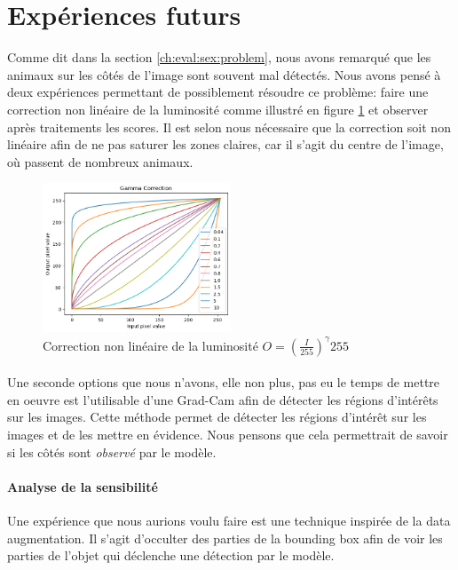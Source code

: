 \section{Expériences futurs}
Comme dit dans la section \ref{ch:eval:sex:problem}, nous avons remarqué que les animaux sur les côtés de l'image sont souvent mal détectés. Nous avons pensé à deux expériences permettant de possiblement résoudre ce problème: faire une correction non linéaire de la luminosité comme illustré en figure \ref{fig:gamma_correction} et observer après traitements les scores. Il est selon nous nécessaire que la correction soit non linéaire afin de ne pas saturer les zones claires, car il s'agit du centre de l'image, où passent de nombreux animaux.
\begin{figure}[H]
\centering
\includegraphics[width=0.5\textwidth]{images/gamma_correction.png}
\caption{Correction non linéaire de la luminosité $O = \displaystyle{\left( \frac{I}{255} \right)^\gamma255}$}
\label{fig:gamma_correction}
\end{figure}

\paragraph{}
Une seconde options que nous n'avons, elle non plus, pas eu le temps de mettre en oeuvre est l'utilisable d'une Grad-Cam afin de détecter les régions d'intérêts sur les images. Cette méthode permet de détecter les régions d'intérêt sur les images et de les mettre en évidence. Nous pensons que cela permettrait de savoir si les côtés sont \textit{observé} par le modèle.

\paragraph{Analyse de la sensibilité}
Une expérience que nous aurions voulu faire est une technique inspirée de la data augmentation. Il s'agit d'occulter des parties de la bounding box afin de voir les parties de l'objet qui déclenche une détection par le modèle.
